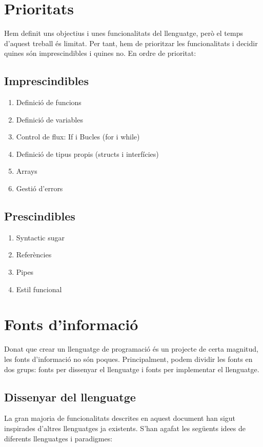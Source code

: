 ﻿\documentclass{article}
\begin{document}
\section{Prioritats}
Hem definit uns objectius i unes funcionalitats del llenguatge, però el temps 
d'aquest treball és limitat. Per tant, hem de prioritzar les funcionalitats i 
decidir quines són imprescindibles i quines no. En ordre de prioritat:

\subsection{Imprescindibles}
\begin{enumerate}
    \item Definició de funcions
    \item Definició de variables
    \item Control de flux: If i Bucles (for i while)
    \item Definició de tipus propis (structs i interfícies)
    \item Arrays
    \item Gestió d'errors
\end{enumerate}

\subsection{Prescindibles}
\begin{enumerate}
    \item Syntactic sugar
    \item Referències
    \item Pipes
    \item Estil funcional
\end{enumerate}

\section{Fonts d'informació}
Donat que crear un llenguatge de programació és un projecte de certa magnitud,
les fonts d'informació no són poques. Principalment, podem dividir les fonts en
dos grups: fonts per dissenyar el llenguatge i fonts per implementar el llenguatge.

\subsection{Dissenyar del llenguatge}
La gran majoria de funcionalitats descrites en aquest document han sigut
inspirades d'altres llenguatges ja existents. S'han agafat les següents idees de
diferents llenguatges i paradigmes:
\end{document}

